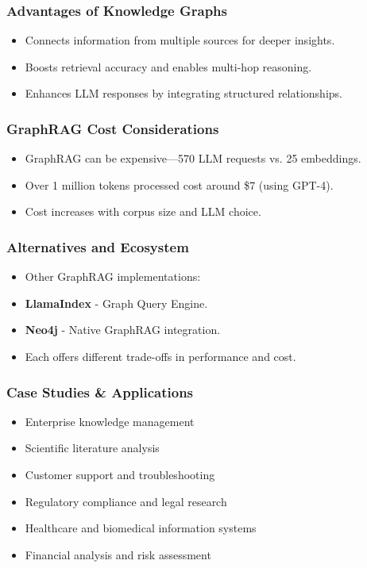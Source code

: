 \begin{frame}[fragile]\frametitle{Advantages of Knowledge Graphs}
    \begin{itemize}
        \item Connects information from multiple sources for deeper insights.
        \item Boosts retrieval accuracy and enables multi-hop reasoning.
        \item Enhances LLM responses by integrating structured relationships.
    \end{itemize}
\end{frame}

\begin{frame}[fragile]\frametitle{GraphRAG Cost Considerations}
  \begin{itemize}
    \item GraphRAG can be expensive—570 LLM requests vs. 25 embeddings.
    \item Over 1 million tokens processed cost around \$7 (using GPT-4).
    \item Cost increases with corpus size and LLM choice.
  \end{itemize}
\end{frame}

\begin{frame}[fragile]\frametitle{Alternatives and Ecosystem}
  \begin{itemize}
    \item Other GraphRAG implementations:
    \item \textbf{LlamaIndex} - Graph Query Engine.
    \item \textbf{Neo4j} - Native GraphRAG integration.
    \item Each offers different trade-offs in performance and cost.
  \end{itemize}
\end{frame}

\begin{frame}[fragile]\frametitle{Case Studies \& Applications}
	\begin{itemize}
	\item Enterprise knowledge management
	\item Scientific literature analysis
	\item Customer support and troubleshooting
	\item Regulatory compliance and legal research
	\item Healthcare and biomedical information systems
	\item Financial analysis and risk assessment
	\end{itemize}

\end{frame}





